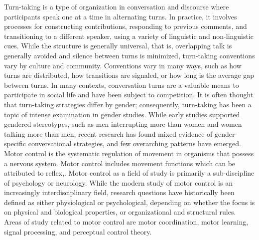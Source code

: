 \documentclass[conference]{IEEEtran}
\begin{document}
Turn-taking is a type of organization in conversation and discourse where participants speak 
one at a time in alternating turns. In practice, it involves processes for constructing 
contributions, responding to previous comments, and transitioning to a different speaker, 
using a variety of linguistic and non-linguistic cues.\cite{BehaviorlaStudy1964}
While the structure is generally universal,\cite{RoboticMovement} that is, overlapping talk is generally 
avoided and silence between turns is minimized, turn-taking conventions vary by culture 
and community.\cite{EnhanceEmpiri2011} Conventions vary in many ways, such as how turns are distributed, how 
transitions are signaled, or how long is the average gap between turns.
In many contexts, conversation turns are a valuable means to participate in social life 
and have been subject to competition.\cite{DOMER2011} It is often thought that turn-taking strategies 
differ by gender; consequently, turn-taking has been a topic of intense examination in 
gender studies. While early studies supported gendered stereotypes, such as men interrupting
more than women and women talking more than men,\cite{DefineSocial2005} recent research has found mixed evidence 
of gender-specific conversational strategies, and few overarching patterns have emerged.\cite{SocialInteract2003}\\

Motor control is the systematic regulation of movement in organisms that possess 
a nervous system. Motor control includes movement functions which can be attributed 
to reflex,\cite{BehaviorlaStudy1964}. Motor control as a field of study is primarily a sub-discipline of 
psychology or neurology. While the modern 
study of motor control is an increasingly interdisciplinary field, research 
questions have historically been defined as either physiological or psychological, 
depending on whether the focus is on physical and biological properties, or 
organizational and structural rules.\cite{DOMER2011} Areas of study related to motor control 
are motor coordination, motor learning, signal processing, and perceptual control 
theory.\\

\end{document}
